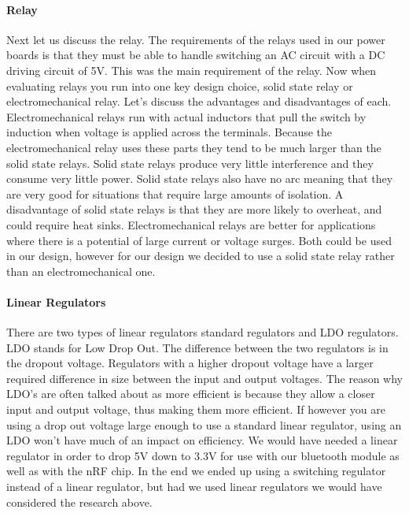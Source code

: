 \paragraph{Relay}
Next let us discuss the relay. The requirements of the relays used in our power
boards is that they must be able to handle switching an AC circuit with a DC
driving circuit of 5V. This was the main requirement of the relay. Now when
evaluating relays you run into one key design choice, solid state relay or
electromechanical relay. Let{}'s discuss the advantages and disadvantages of
each. Electromechanical relays run with actual inductors that pull the switch
by induction when voltage is applied across the terminals. Because the
electromechanical relay uses these parts they tend to be much larger than
the solid state relays. Solid state relays produce very little interference and
they consume very little power. Solid state relays also have no arc meaning
that they are very good for situations that require large amounts of isolation.
A disadvantage of solid state relays is that they are more likely to overheat,
and could require heat sinks. Electromechanical relays are better for
applications where there is a potential of large current or voltage surges.
Both could be used in our design, however for our design we decided to use a
solid state relay rather than an electromechanical one.
\cite{link8}

\paragraph{Linear Regulators}
There are two types of linear regulators standard regulators and LDO regulators.
LDO stands for Low Drop Out. The difference between the two regulators is in
the dropout voltage. Regulators with a higher dropout voltage have a larger
required difference in size between the input and output voltages. The reason
why LDO{}'s are often talked about as more efficient is because they allow a closer input and output voltage, thus making them more efficient. If
however you are using a drop out voltage large enough to use a standard linear
regulator, using an LDO won{}'t have much of an impact on efficiency. We would have 
needed a linear regulator in order to drop 5V down to 3.3V for use with our
bluetooth module as well as with the nRF chip. In the end we ended up using a switching regulator instead of a linear regulator, but had we used linear regulators we would have considered the research above. 
\cite{link9}

